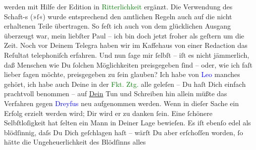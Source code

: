 {                                 werden mit Hilfe der Edition in \textcolor{green}{Ritterlichkeit} ergänzt. Die Verwendung des Schaft-s (»ſ«)
                                 wurde entsprechend den amtlichen Regeln auch auf die nicht
                                 erhaltenen Teile übertragen. }\toendnotes[C]{\smallbreak}\pstart
           \noindent{}{\pb}So feſt ich auch von dem glücklichen Ausgang
               überzeugt war, mein liebſter Paul – ich bin doch jetzt froher als geſtern um die Zeit. Noch vor Deinem Telegra{\geminationm} haben wir im Kaffehaus von einer Redaction {\pb}das Reſultat telephoniſch erfahren. Und nun ſage mir
               ſelbſt – iſt es nicht jämmerlich, daß Menschen wie Du ſolchen Möglichkeiten
               preisgegeben ſind – oder, wie ich faſt lieber ſagen möchte, preisgegeben zu ſein
               glauben? Ich habe von \textcolor{blue}{Leo}{}\ledrightnote{\textcolor{blue}{Leo Van-Jung}} manches gehört, ich
               habe auch Deine \label{K_L02686-1v}\label{K_L02686-1h} in der \textcolor{green}{Fkt. Ztg.}{}\ledrightnote{\textcolor{green}{Frankfurter Zeitung}} alle geleſen – Du haſt
               Dich einfach prachtvoll benommen – auf \uline{Dein} Tun und
               Schreiben hin allein müßte das Verfahren gegen \textcolor{blue}{Dreyfus}{}\ledrightnote{\textcolor{blue}{Alfred Dreyfus}} neu aufgenommen werden.\pend
           \pstart
           Wenn in dieſer Sache ein Erfolg erzielt werden wird; Dir wird er zu danken ſein. Eine
               ſchönere Selbſtloſig{\pb}keit hat ſelten ein Mann in
               Deiner Lage bewieſen. Es iſt ebenſo edel als blödſinnig, daſs Du Dich geſchlagen haſt
               – wärſt Du aber erſchoſſen worden, ſo hätte die Ungeheuerlichkeit des Blödſinns alles
